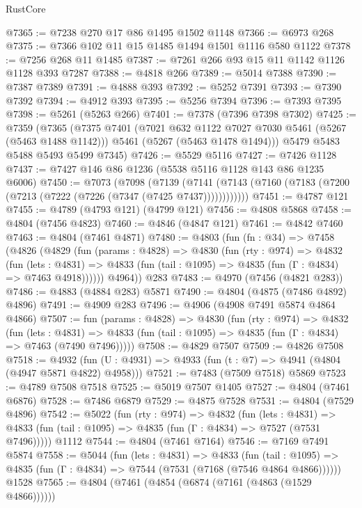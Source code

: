 \begin{lexlean}{RustCore}
\begin{coremodule}
@7365 := @7238 @270 @17 @86 @1495 @1502 @1148
@7366 := @6973 @268
@7375 := @7366 @102 @11 @15 @1485 @1494 @1501 @1116 @580 @1122
@7378 := @7256 @268 @11 @1485
@7387 := @7261 @266 @93 @15 @11 @1142 @1126 @1128 @393 @7287
@7388 := @4818 @266
@7389 := @5014 @7388
@7390 := @7387 @7389
@7391 := @4888 @393
@7392 := @5252 @7391
@7393 := @7390 @7392
@7394 := @4912 @393
@7395 := @5256 @7394
@7396 := @7393 @7395
@7398 := @5261 (@5263 @266)
@7401 := @7378 (@7396 @7398 @7302)
@7425 := @7359
    (@7365
      (@7375
        @7401
        (@7021 @632 @1122 @7027 @7030 @5461 (@5267 (@5463 @1488 @1142)))
        @5461
        (@5267 (@5463 @1478 @1494)))
      @5479
      @5483
      @5488
      @5493
      @5499
      @7345)
@7426 := @5529 @5116
@7427 := @7426 @1128
@7437 := @7427 @146 @86 @1236 (@5538 @5116 @1128 @143 @86 @1235 @6006)
@7450 := @7073
    (@7098
      (@7139 (@7141 (@7143 (@7160 (@7183 (@7200 (@7213 (@7222 (@7226 (@7347 (@7425 @7437))))))))))))
@7451 := @4787 @121
@7455 := @4789 (@4793 @121) (@4799 @121)
@7456 := @4808 @5868
@7458 := @4804 (@7456 @4823)
@7460 := @4846 (@4847 @121)
@7461 := @4842 @7460
@7463 := @4804 (@7461 @4871)
@7480 := @4803
    (fun (fn : @34) =>
    @7458
      (@4826
        (@4829
          (fun (params : @4828) =>
          @4830
            (fun (rty : @974) =>
            @4832
              (fun (lets : @4831) =>
              @4833 (fun (tail : @1095) => @4835 (fun (Γ : @4834) => @7463 @4918))))))
        @4964))
    @283
@7483 := @4970 (@7456 (@4821 @283))
@7486 := @4883 (@4884 @283) @5871
@7490 := @4804 (@4875 (@7486 @4892) @4896)
@7491 := @4909 @283
@7496 := @4906 (@4908 @7491 @5874 @4864 @4866)
@7507 := fun (params : @4828) =>
  @4830
    (fun (rty : @974) =>
    @4832
      (fun (lets : @4831) =>
      @4833 (fun (tail : @1095) => @4835 (fun (Γ : @4834) => @7463 (@7490 @7496)))))
@7508 := @4829 @7507
@7509 := @4826 @7508
@7518 := @4932 (fun (U : @4931) => @4933 (fun (t : @7) => @4941 (@4804 (@4947 @5871 @4822) @4958)))
@7521 := @7483 (@7509 @7518) @5869
@7523 := @4789 @7508 @7518
@7525 := @5019 @7507 @1405
@7527 := @4804 (@7461 @6876)
@7528 := @7486 @6879
@7529 := @4875 @7528
@7531 := @4804 (@7529 @4896)
@7542 := @5022
    (fun (rty : @974) =>
    @4832
      (fun (lets : @4831) =>
      @4833 (fun (tail : @1095) => @4835 (fun (Γ : @4834) => @7527 (@7531 @7496)))))
    @1112
@7544 := @4804 (@7461 @7164)
@7546 := @7169 @7491 @5874
@7558 := @5044
    (fun (lets : @4831) =>
    @4833
      (fun (tail : @1095) => @4835 (fun (Γ : @4834) => @7544 (@7531 (@7168 (@7546 @4864 @4866))))))
    @1528
@7565 := @4804 (@7461 (@4854 (@6874 (@7161 (@4863 (@1529 @4866))))))

\end{coremodule}
\end{lexlean}
